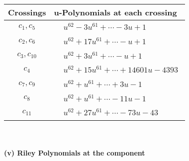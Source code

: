 \documentclass[1p]{elsarticle_modified}
\theoremstyle{definition}
\begin{document}
\begin{tabular}{m{50pt}|m{274pt}}
Crossings & \hspace{64pt}u-Polynomials at each crossing \\
\hline $$\begin{aligned}c_{1},c_{5}\end{aligned}$$&$\begin{aligned}
&u^{62}-3 u^{61}+\cdots-3 u+1
\end{aligned}$\\
\hline $$\begin{aligned}c_{2},c_{6}\end{aligned}$$&$\begin{aligned}
&u^{62}+17 u^{61}+\cdots- u+1
\end{aligned}$\\
\hline $$\begin{aligned}c_{3},c_{10}\end{aligned}$$&$\begin{aligned}
&u^{62}+3 u^{61}+\cdots- u+1
\end{aligned}$\\
\hline $$\begin{aligned}c_{4}\end{aligned}$$&$\begin{aligned}
&u^{62}+15 u^{61}+\cdots+14601 u-4393
\end{aligned}$\\
\hline $$\begin{aligned}c_{7},c_{9}\end{aligned}$$&$\begin{aligned}
&u^{62}+u^{61}+\cdots+3 u-1
\end{aligned}$\\
\hline $$\begin{aligned}c_{8}\end{aligned}$$&$\begin{aligned}
&u^{62}+u^{61}+\cdots-11 u-1
\end{aligned}$\\
\hline $$\begin{aligned}c_{11}\end{aligned}$$&$\begin{aligned}
&u^{62}+27 u^{61}+\cdots-73 u-43
\end{aligned}$\\
\hline
\end{tabular}\\~\\
\newpage\renewcommand{\arraystretch}{1}
\flushleft \textbf{(v) Riley Polynomials at the component}\newline \\
\end{document}
